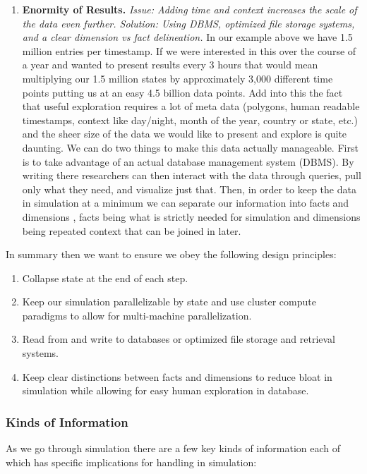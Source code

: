 \documentclass[11pt]{article}
\begin{document}
\begin{enumerate}
\item \textbf{Enormity of Results.} \textit{Issue: Adding time and context increases the scale of the data even further. Solution: Using DBMS, optimized file storage systems, and a clear dimension vs fact delineation.} \newline In our example above we have 1.5 million entries per timestamp. If we were interested in this over the course of a year and wanted to present results every 3 hours that would mean multiplying our 1.5 million states by approximately 3,000 different time points putting us at an easy 4.5 billion data points. Add into this the fact that useful exploration requires a lot of meta data (polygons, human readable timestamps, context like day/night, month of the year, country or state, etc.) and the sheer size of the data we would like to present and explore is quite daunting. We can do two things to make this data actually manageable. First is to take advantage of an actual database management system (DBMS). By writing there researchers can then interact with the data through queries, pull only what they need, and visualize just that. Then, in order to keep the data in simulation at a minimum we can separate our information into facts and dimensions \cite{datawarehouse}, facts being what is strictly needed for simulation and dimensions being repeated context that can be joined in later. 
\end{enumerate}

In summary then we want to ensure we obey the following design principles:

\begin{enumerate}
\item Collapse state at the end of each step.
\item Keep our simulation parallelizable by state and use cluster compute paradigms to allow for multi-machine parallelization.
\item Read from and write to databases or optimized file storage and retrieval systems.
\item Keep clear distinctions between facts and dimensions to reduce bloat in simulation while allowing for easy human exploration in database. 
\end{enumerate}

\subsubsection{Kinds of Information}

As we go through simulation there are a few key kinds of information each of which has specific implications for handling in simulation:
\end{document}
